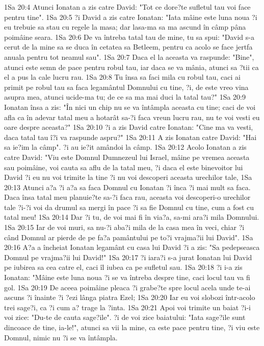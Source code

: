 1Sa 20:4  Atunci Ionatan a zis catre David: "Tot ce dore?te sufletul tau voi face pentru tine".
1Sa 20:5  ?i David a zis catre Ionatan: "Iata mâine este luna noua ?i eu trebuie sa stau cu regele la masa; dar lasa-ma sa ma ascund în câmp pâna poimâine seara.
1Sa 20:6  De va întreba tatal tau de mine, tu sa spui: "David s-a cerut de la mine sa se duca în cetatea sa Betleem, pentru ca acolo se face jertfa anuala pentru tot neamul sau".
1Sa 20:7  Daca el la aceasta va raspunde: "Bine", atunci este semn de pace pentru robul tau, iar daca se va mânia, atunci sa ?tii ca el a pus la cale lucru rau.
1Sa 20:8  Tu însa sa faci mila cu robul tau, caci ai primit pe robul tau sa faca legamântul Domnului cu tine, ?i, de este vreo vina asupra mea, atunci ucide-ma tu; de ce sa ma mai duci la tatal tau?"
1Sa 20:9  Ionatan însa a zis: "În nici un chip nu se va întâmpla aceasta cu tine; caci de voi afla ca în adevar tatal meu a hotarât sa-?i faca vreun lucru rau, nu te voi vesti eu oare despre aceasta?"
1Sa 20:10  ?i a zis David catre Ionatan: "Cine ma va vesti, daca tatal tau î?i va raspunde aspru?"
1Sa 20:11  A zis Ionatan catre David: "Hai sa ie?im la câmp". ?i au ie?it amândoi la câmp.
1Sa 20:12  Acolo Ionatan a zis catre David: "Viu este Domnul Dumnezeul lui Israel, mâine pe vremea aceasta sau poimâine, voi cauta sa aflu de la tatal meu, ?i daca el este binevoitor lui David ?i eu nu voi trimite la tine ?i nu voi descoperi aceasta urechilor tale,
1Sa 20:13  Atunci a?a ?i a?a sa faca Domnul cu Ionatan ?i înca ?i mai mult sa faca. Daca însa tatal meu planuie?te sa-?i faca rau, aceasta voi descoperi-o urechilor tale ?i-?i voi da drumul sa mergi în pace ?i sa fie Domnul cu tine, cum a fost cu tatal meu!
1Sa 20:14  Dar ?i tu, de voi mai fi în via?a, sa-mi ara?i mila Domnului.
1Sa 20:15  Iar de voi muri, sa nu-?i aba?i mila de la casa mea în veci, chiar ?i când Domnul ar pierde de pe fa?a pamântului pe to?i vrajma?ii lui David".
1Sa 20:16  A?a a încheiat Ionatan legamânt cu casa lui David ?i a zis: "Sa pedepseasca Domnul pe vrajma?ii lui David!"
1Sa 20:17  ?i iara?i s-a jurat Ionatan lui David pe iubirea sa cea catre el, caci îl iubea ca pe sufletul sau.
1Sa 20:18  ?i i-a zis Ionatan: "Mâine este luna noua ?i se va întreba despre tine, caci locul tau va fi gol.
1Sa 20:19  De aceea poimâine pleaca ?i grabe?te spre locul acela unde te-ai ascuns ?i înainte ?i ?ezi lânga piatra Ezel;
1Sa 20:20  Iar eu voi slobozi într-acolo trei sage?i, ca ?i cum a? trage la ?inta.
1Sa 20:21  Apoi voi trimite un baiat ?i-i voi zice: "Du-te de cauta sage?ile". ?i de voi zice baiatului: "Iata sage?ile sunt dincoace de tine, ia-le!", atunci sa vii la mine, ca este pace pentru tine, ?i viu este Domnul, nimic nu ?i se va întâmpla.
